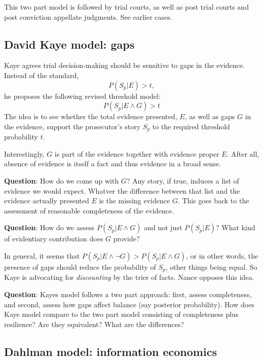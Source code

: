 \documentclass[
  10pt,
  dvipsnames,enabledeprecatedfontcommands]{scrartcl}
\begin{document}
This two part model is followed by trial courts, as well as post trial
courts and post conviction appellate judgments. See earlier cases.

\hypertarget{david-kaye-model-gaps}{%
\subsection{David Kaye model: gaps}\label{david-kaye-model-gaps}}

Kaye agrees trial decision-making should be sensitive to gaps in the
evidence. Instead of the standard, \[P(S_p | E)>t,\] he proposes the
following revised threshold model: \[P(S_p | E \wedge G)>t\] The idea is
to see whether the total evidence presented, \(E\), as well as gaps
\(G\) in the evidence, support the prosecutor's story \(S_p\) to the
required threshold probability \(t\).

Interestingly, \(G\) is part of the evidence together with evidence
proper \(E\). After all, absence of evidence is itself a fact and thus
evidence in a broad sense.

\textbf{Question}: How do we come up with \(G\)? Any story, if true,
induces a list of evidence we would expect. Whatver the difference
between that list and the evidence actually presented \(E\) is the
missing evidence \(G\). This goes back to the assessment of reasonable
completeness of the evidence.

\textbf{Question}: How do we assess \(P(S_p | E \wedge G)\) and not just
\(P(S_p | E)\)? What kind of evidentiary contribution does \(G\)
provide?

In general, it seems that
\(P(S_p | E \wedge \neg G) > P(S_p | E \wedge G)\), or in other words,
the presence of gaps should reduce the probability of \(S_p\), other
things being equal. So Kaye is advocating for \emph{discounting} by the
trier of facts. Nance opposes this idea.

\textbf{Question}: Kayes model follows a two part approach: first,
assess completeness, and second, assess how gaps affect balance (say
posterior probability). How does Kaye model compare to the two part
model consisting of completeness plus resilience? Are they equivalent?
What are the differences?

\hypertarget{dahlman-model-information-economics}{%
\subsection{Dahlman model: information
economics}\label{dahlman-model-information-economics}}
\end{document}
